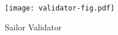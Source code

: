 \begin{figure}
    \texttt{[image: validator-fig.pdf]}
    \caption{Sailor Validator}
    \label{fig:validator}
\end{figure}
